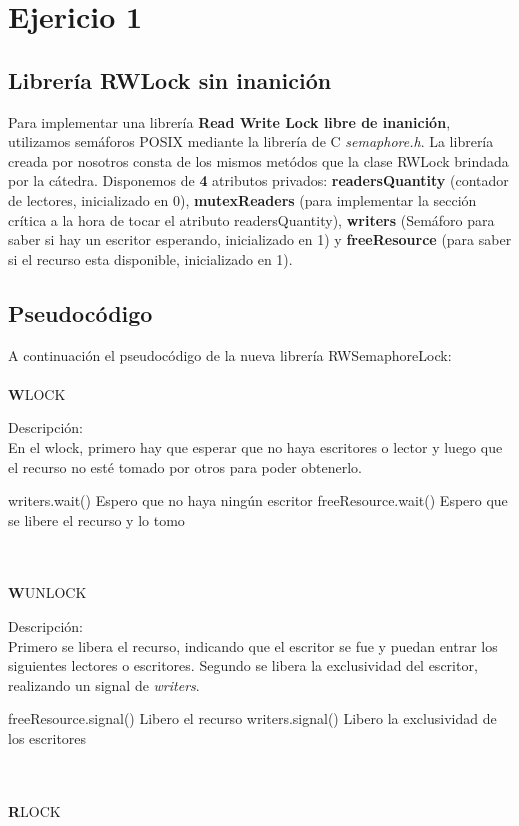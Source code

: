 \section{Ejericio 1}
\subsection{Librería RWLock sin inanición}
Para implementar una librer\'ia \textbf{Read Write Lock libre de inanici\'on}, utilizamos semáforos POSIX mediante la librería de C \textit{semaphore.h}. La librería creada por nosotros consta de los mismos metódos que la clase RWLock brindada por la cátedra. Disponemos de \textbf{4} atributos privados: \textbf{readersQuantity} (contador de lectores, inicializado en 0), \textbf{mutexReaders} (para implementar la sección crítica a la hora de tocar el atributo readersQuantity), \textbf{writers} (Semáforo para saber si hay un escritor esperando, inicializado en 1) y \textbf{freeResource} (para saber si el recurso esta disponible, inicializado en 1).

\subsection{Pseudoc\'odigo}

A continuación el pseudocódigo de la nueva librería RWSemaphoreLock:\\
\mbox{}\\
\textbf WLOCK

Descripción:\\
En el wlock, primero hay que esperar que no haya escritores o lector y luego  que el recurso no esté tomado por otros para poder obtenerlo.
\begin{codebox}

\li	writers.wait() 		\RComment Espero que no haya ningún escritor
\li	freeResource.wait() 	\RComment Espero que se libere el recurso y lo tomo 
\end{codebox}
\mbox{}\\\mbox{}\\
\textbf WUNLOCK
			
Descripción:\\
Primero se libera el recurso, indicando que el escritor se fue y puedan entrar los siguientes lectores o escritores.
Segundo se libera la exclusividad del escritor, realizando un signal de \textit{writers}. 
\begin{codebox}
\li	freeResource.signal()		\RComment Libero el recurso	
\li	writers.signal()		\RComment Libero la exclusividad de los escritores
\end{codebox}
\mbox{}\\\mbox{}\\
\textbf RLOCK

